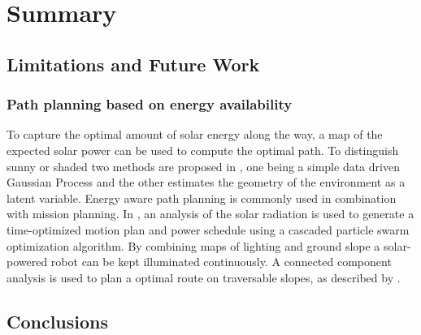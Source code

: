 \chapter{Summary}
\label{chp:summary}

\section{Limitations and Future Work}







\subsection{Path planning based on energy availability}

To capture the optimal amount of solar energy along the way, a map of the expected solar power can be used to compute the optimal path. To distinguish sunny or shaded two methods are proposed in \cite{plonski_tranro_2016}, one being a simple data driven Gaussian Process and the other estimates the geometry of the environment as a latent variable.
Energy aware path planning is commonly used in combination with mission planning.
In \cite{kaplan_iros_2016}, an analysis of the solar radiation is used to generate a time-optimized motion plan and power schedule using a cascaded particle swarm optimization algorithm.
By combining maps of lighting and ground slope a solar-powered robot can be kept illuminated continuously. A connected component analysis is used to plan a optimal route on traversable slopes, as described by \cite{otten_icra_2015}.

\section{Conclusions}
